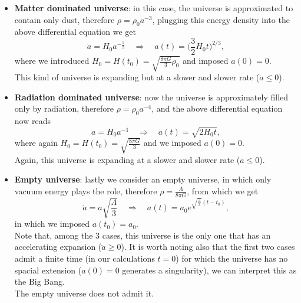 \begin{itemize}
    \item \textbf{Matter dominated universe}: in this case, the universe is approximated to contain only dust, therefore $\rho=\rho_0a^{-3}$, plugging this energy density into the above differential equation we get$$\dot a=H_0a^{-\frac{1}{2}}\quad \Rightarrow\quad a(t)=\bigg(\frac{3}{2}H_0t\bigg)^{2/3},$$ where we introduced $H_0=H(t_0)=\sqrt{\frac{8\pi G}{3}\rho_0}$ and imposed $a(0)=0$.\\ This kind of universe is expanding but at a slower and slower rate ($\ddot a\leq0$).
    \item  \textbf{Radiation dominated universe}: now the universe is approximately filled only by radiation, therefore $\rho=\rho_0a^{-4}$, and the above differential equation now reads$$\dot a=H_0a^{-1}\quad \Rightarrow\quad a(t)=\sqrt{2H_0t},$$ where again $H_0=H(t_0)=\sqrt{\frac{8\pi G}{3}}$ and we imposed $a(0)=0$.\\ Again, this universe is expanding at a slower and slower rate ($\ddot a\leq0$).
    \item \textbf{Empty universe}: lastly we consider an empty universe, in which only vacuum energy plays the role, therefore $\rho=\frac{\Lambda}{8\pi G}$, from which we get$$\dot a=a\sqrt{\frac{\Lambda}{3}}\quad \Rightarrow\quad a(t)=a_0e^{\sqrt{\frac{\Lambda}{3}}(t-t_0)},$$
     in which we imposed $a(t_0)=a_0$.\\Note that, among the 3 cases, this universe is the only one that has an accelerating expansion ($\ddot a\geq0$). It is worth noting also that the first two cases admit a finite time (in our calculations $t=0$) for which the universe has no spacial extension ($a(0)=0$ generates a singularity), we can interpret this as the Big Bang.\\ The empty universe does not admit it. 
\end{itemize} 